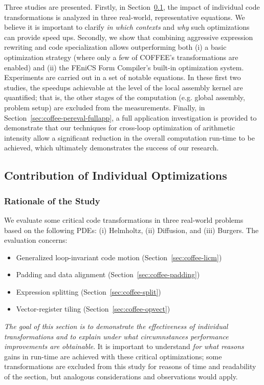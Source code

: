 Three studies are presented. Firstly, in Section~\ref{sec:coffee-perfeval-single}, the impact of individual code transformations is analyzed in three real-world,
representative equations. We believe it is important to clarify \textit{in which contexts} and \textit{why} such optimizations can provide speed ups. Secondly, we show that combining aggressive expression rewriting and code specialization allows outperforming both (i) a basic optimization strategy (where only a few of COFFEE's transformations are enabled) and (ii) the FEniCS Form Compiler's built-in optimization system. Experiments are carried out in a set of notable equations. In these first two studies, the speedups achievable at the level of the local assembly kernel are quantified; that is, the other stages of the computation (e.g. global assembly, problem setup) are excluded from the measurements. Finally, in Section~\ref{sec:coffee-pereval-fullapp}, a full application investigation is provided to demonstrate that our techniques for cross-loop optimization of arithmetic intensity allow a significant reduction in the overall computation run-time to be achieved, which ultimately demonstrates the success of our research.

\subsection{Contribution of Individual Optimizations}
\label{sec:coffee-perfeval-single}

\subsubsection{Rationale of the Study}
\label{sec:coffee-individual-rationale}
We evaluate some critical code transformations in three real-world problems based on the following PDEs: (i) Helmholtz, (ii) Diffusion, and (iii) Burgers. The evaluation concerns:
\begin{itemize}
\item Generalized loop-invariant code motion (Section~\ref{sec:coffee-licm})
\item Padding and data alignment (Section~\ref{sec:coffee-padding})
\item Expression splitting (Section~\ref{sec:coffee-split})
\item Vector-register tiling (Section~\ref{sec:coffee-opvect})
\end{itemize}
\textit{The goal of this section is to demonstrate the effectiveness of individual transformations and to explain under what circumnstances performance improvements are obtainable}. It is important to understand \textit{for what reasons} gains in run-time are achieved with these critical optimizations; some transformations are excluded from this study for reasons of time and readability of the section, but analogous considerations and observations would apply. 


